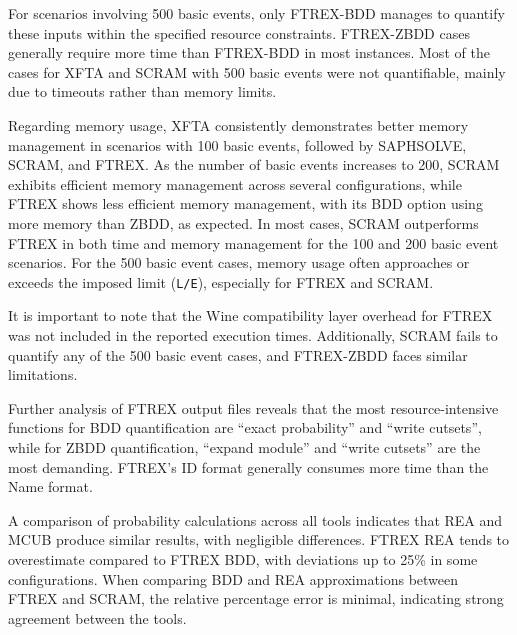 For scenarios involving 500 basic events, only FTREX-BDD manages to quantify these inputs within the specified resource constraints. FTREX-ZBDD cases generally require more time than FTREX-BDD in most instances. Most of the cases for XFTA and SCRAM with 500 basic events were not quantifiable, mainly due to timeouts rather than memory limits.

Regarding memory usage, XFTA consistently demonstrates better memory management in scenarios with 100 basic events, followed by SAPHSOLVE, SCRAM, and FTREX. As the number of basic events increases to 200, SCRAM exhibits efficient memory management across several configurations, while FTREX shows less efficient memory management, with its BDD option using more memory than ZBDD, as expected. In most cases, SCRAM outperforms FTREX in both time and memory management for the 100 and 200 basic event scenarios. For the 500 basic event cases, memory usage often approaches or exceeds the imposed limit (\texttt{L/E}), especially for FTREX and SCRAM.

It is important to note that the Wine compatibility layer overhead for FTREX was not included in the reported execution times. Additionally, SCRAM fails to quantify any of the 500 basic event cases, and FTREX-ZBDD faces similar limitations.

Further analysis of FTREX output files reveals that the most resource-intensive functions for BDD quantification are ``exact probability'' and ``write cutsets'', while for ZBDD quantification, ``expand module'' and ``write cutsets'' are the most demanding. FTREX's ID format generally consumes more time than the Name format.

A comparison of probability calculations across all tools indicates that REA and MCUB produce similar results, with negligible differences. FTREX REA tends to overestimate compared to FTREX BDD, with deviations up to 25\% in some configurations. When comparing BDD and REA approximations between FTREX and SCRAM, the relative percentage error is minimal, indicating strong agreement between the tools.
